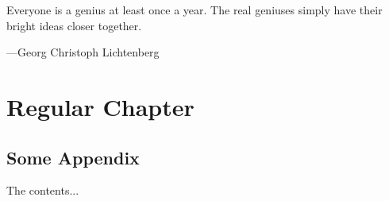 \documentclass[12pt,twoside,titlepage,capitalize,draft]{upm-thesis}
\begin{document}
\begin{Inscription}
Everyone is a genius at least once a year. The real geniuses simply have their bright ideas closer together.

---Georg Christoph Lichtenberg
\end{Inscription}

\tableofcontents

\mainmatter
\chapter{Regular Chapter}

\backmatter
\begin{appendices}
\chapter{Some Appendix}
The contents...
\end{appendices}
\end{document}

